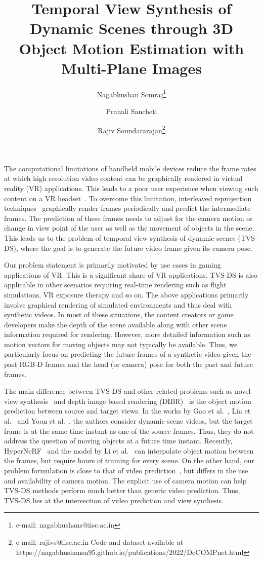 \documentclass[preprint]{vgtc}
\title{Temporal View Synthesis of Dynamic Scenes through 3D Object Motion Estimation with Multi-Plane Images}
\author{Nagabhushan Somraj\thanks{e-mail: nagabhushans@iisc.ac.in}\and Pranali Sancheti \and Rajiv Soundararajan\thanks{e-mail: rajivs@iisc.ac.in \newline Code and dataset available at \newline https://nagabhushansn95.github.io/publications/2022/DeCOMPnet.html}}
\affiliation{\scriptsize Department of Electrical Communication Engineering,\\Indian Institute of Science}
\def\etal{et al.}
\begin{document}

\maketitle

The computational limitations of handheld mobile devices reduce the frame rates at which high resolution video content can be graphically rendered in virtual reality (VR) applications.
    This leads to a poor user experience when viewing such content on a VR headset~\cite{oculus2015atw_examined}.
    To overcome this limitation, interleaved reprojection techniques~\cite{oculus2016atw, oculus2016asw, oculus2019asw2, valve2016interleaved} graphically render frames periodically and predict the intermediate frames.
    The prediction of these frames needs to adjust for the camera motion or change in view point of the user as well as the movement of objects in the scene.
    This leads us to the problem of temporal view synthesis of dynamic scenes (TVS-DS), where the goal is to generate the future video frame given its camera pose.
    
    Our problem statement is primarily motivated by use cases in gaming applications of VR.
    This is a significant share of VR applications. 
    TVS-DS is also applicable in other scenarios requiring real-time rendering such as flight simulations, VR exposure therapy and so on.
The above applications primarily involve graphical rendering of simulated environments and thus deal with synthetic videos. 
    In most of these situations, the content creators or game developers make the depth of the scene available along with other scene information required for rendering. 
    However, more detailed information such as motion vectors for moving objects may not typically be available.
    Thus, we particularly focus on predicting the future frames of a synthetic video given the past RGB-D frames and the head (or camera) pose for both the past and future frames.
    

    The main difference between TVS-DS and other related problems such as novel view synthesis~\cite{zhou2016view, wiles2020synsin} and depth image based rendering (DIBR)~\cite{cho2017hole,luo2020disocclusion} is the object motion prediction between source and target views.
    In the works by Gao \etal~\cite{gao2021dynamic}, Lin \etal~\cite{lin2021deep} and Yoon \etal~\cite{yoon2020novel}, the authors consider dynamic scene videos, but the target frame is at the same time instant as one of the source frames.
    Thus, they do not address the question of moving objects at a future time instant.
    Recently, HyperNeRF~\cite{park2021hypernerf} and the model by Li \etal~\cite{li2021neural} can interpolate object motion between the frames, but require hours of training for every scene.
    On the other hand, our problem formulation is close to that of video prediction~\cite{srivastava2015unsupervised,mathieu2016deep}, but differs in the use and availability of camera motion.
    The explicit use of camera motion can help TVS-DS methods perform much better than generic video prediction.
    Thus, TVS-DS lies at the intersection of video prediction and view synthesis.
\end{document}
